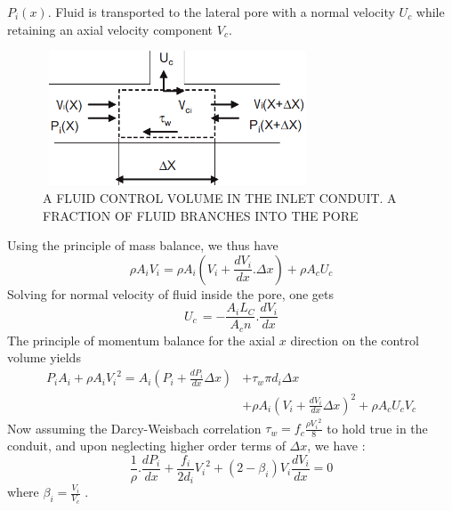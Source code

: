 \documentclass[twocolumn,10pt,cleanfoot]{ihmtc}
\begin{document}
$P_i(x)$. Fluid is transported to the lateral pore with a normal
velocity $U_c$ while retaining an axial velocity component $V_c$. 
%
\begin{figure}[ht]
\centerline{\includegraphics[width=80mm,height=40mm,scale=0.50]{inletcon.PNG}}
\vspace{-1.5ex}
\caption{\small{A FLUID CONTROL VOLUME IN THE INLET CONDUIT. A FRACTION OF FLUID BRANCHES INTO THE PORE}}
\label{inletcon}
\vspace{-3em}
\end{figure}
%
Using the principle of mass balance, we thus
have%
\begin{equation} \label{in-mass}
\rho {{A}_{i}}{{V}_{i}}=\rho {{A}_{i}}({{V}_{i}}+\frac{d{{V}_{i}}}{dx}.\Delta x)+\rho {{A}_{c}}{{U}_{c}}
\end{equation}
%
Solving for normal velocity of fluid inside the pore, one gets
%
\begin{equation} \label{in-uc}
{{U}_{c}}\,=-\frac{{{A}_{i}}L_C}{{{A}_{c}}n}.\frac{d{{V}_{i}}}{dx} 
\end{equation}
%
The principle of momentum balance for the axial $x$ direction on the control volume yields
%
\begin{equation} \label{in-mom}
\begin{split}
{{P}_{i}}A_i+\rho {{A}_{i}}{{V}_{i}}^{2}={A}_{i}({{P}_{i}}+\frac{d{{P}_{i}}}{dx}\Delta x) & +{\tau }_{w}\pi {d}_{i}\Delta x \\
& +\rho {A}_{i}{({{V}_{i}}+\frac{d{{V}_{i}}}{dx}\Delta x)}^{2}+\rho {{A}_{c}}{{U}_{c}}{{V}_{c}}
\end{split}
\end{equation}
%
Now assuming the Darcy-Weisbach correlation ${{\tau }_{w}}=f_c\frac{\rho {{V}_{i}}^{2}}{8}$
to hold true in the conduit, and upon neglecting higher order terms
of $\Delta x$, we have :
%
\begin{equation} \label{in-mom-final}
\frac{1}{\rho }.\frac{d{{P}_{i}}}{dx}+\frac{{{f}_{i}}}{2{{d}_{i}}}{{V}_{i}}^{2}+(2-{{\beta }_{i}}){{V}_{i}}\frac{d{{V}_{i}}}{dx}=0
\end{equation} where $\beta_i=\frac{V_i}{V_c}$ . 
\end{document}
